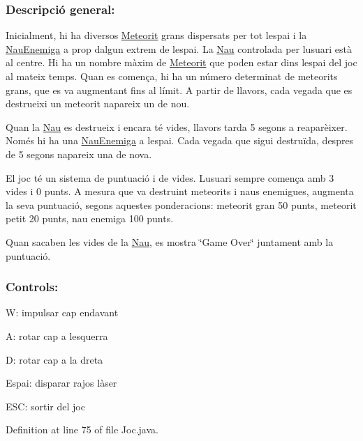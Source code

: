 \subsubsection*{Descripció general\+: }

Inicialment, hi ha diversos \hyperlink{class_meteorit}{Meteorit} grans dispersats per tot l\textquotesingle{}espai i la \hyperlink{class_nau_enemiga}{Nau\+Enemiga} a prop d\textquotesingle{}algun extrem de l\textquotesingle{}espai. La \hyperlink{class_nau}{Nau} controlada per l\textquotesingle{}usuari està al centre. Hi ha un nombre màxim de \hyperlink{class_meteorit}{Meteorit} que poden estar dins l\textquotesingle{}espai del joc al mateix temps. Quan es comença, hi ha un número determinat de meteorits grans, que es va augmentant fins al límit. A partir de llavors, cada vegada que es destrueixi un meteorit n\textquotesingle{}apareix un de nou.

Quan la \hyperlink{class_nau}{Nau} es destrueix i encara té vides, llavors tarda 5 segons a reaparèixer. Només hi ha una \hyperlink{class_nau_enemiga}{Nau\+Enemiga} a l\textquotesingle{}espai. Cada vegada que sigui destruïda, despres de 5 segons n\textquotesingle{}apareix una de nova.

El joc té un sistema de puntuació i de vides. L\textquotesingle{}usuari sempre comença amb 3 vides i 0 punts. A mesura que va destruint meteorits i naus enemigues, augmenta la seva puntuació, segons aquestes ponderacions\+: meteorit gran 50 punts, meteorit petit 20 punts, nau enemiga 100 punts.

Quan s\textquotesingle{}acaben les vides de la \hyperlink{class_nau}{Nau}, es mostra \char`\"{}\+Game Over\char`\"{} juntament amb la puntuació.

\subsubsection*{Controls\+: }


\begin{DoxyItemize}
\item W\+: impulsar cap endavant
\item A\+: rotar cap a l\textquotesingle{}esquerra
\item D\+: rotar cap a la dreta
\item Espai\+: disparar rajos làser
\item E\+S\+C\+: sortir del joc 
\end{DoxyItemize}

Definition at line 75 of file Joc.\+java.



